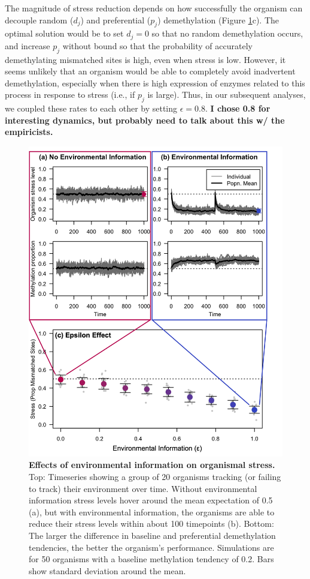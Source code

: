 \documentclass{article}
\begin{document}
The magnitude of stress reduction depends on how successfully the organism can decouple random ($d_j$) and preferential ($p_j$) demethylation (Figure \ref{fig:envfeedback}c). The optimal solution would be to set $d_j = 0$ so that no random demethylation occurs, and increase $p_j$ without bound so that the probability of accurately demethylating mismatched sites is high, even when stress is low. However, it seems unlikely that an organism would be able to completely avoid inadvertent demethylation, especially when there is high expression of enzymes related to this process in response to stress (i.e., if $p_j$ is large). Thus, in our subsequent analyses, we coupled these rates to each other by setting $\epsilon = 0.8$. \textbf{I chose 0.8 for interesting dynamics, but probably need to talk about this w/ the empiricists.}


\begin{figure}
    \centering
    \includegraphics[width=.8\textwidth]{Figures/Fig_EnvironmentalFeedback_Consolidated.png}
    \caption{\textbf{Effects of environmental information on organismal stress.} Top: Timeseries showing a group of 20 organisms tracking (or failing to track) their environment over time. Without environmental information stress levels hover around the mean expectation of 0.5 (a), but with environmental information, the organisms are able to reduce their stress levels within about 100 timepoints (b). Bottom: The larger the difference in baseline and preferential demethylation tendencies, the better the organism's performance. Simulations are for 50 organisms with a baseline methylation tendency of 0.2. Bars show standard deviation around the mean.}
    \label{fig:envfeedback}
\end{figure}
\end{document}
